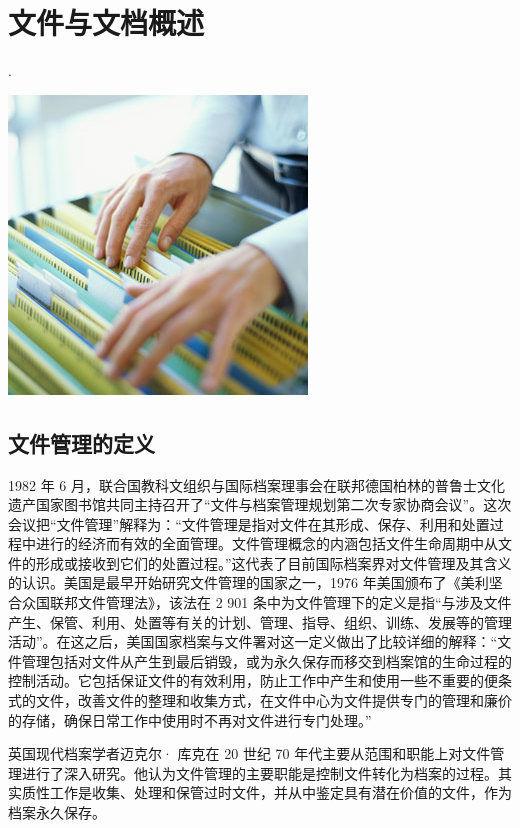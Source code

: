 \section {文件与文档概述}

.
    \begin{center}
        \includegraphics[scale=0.7] {pickfile.jpg}
    \end{center}

    \subsection {文件管理的定义}

    1982 年 6 月，联合国教科文组织与国际档案理事会在联邦德国柏林的普鲁士文化遗产国家图书馆共同主持召开了“文件与档案管理规划第二次专家协商会议”。这次会议把“文件管理”解释为：“文件管理是指对文件在其形成、保存、利用和处置过程中进行的经济而有效的全面管理。文件管理概念的内涵包括文件生命周期中从文件的形成或接收到它们的处置过程。”这代表了目前国际档案界对文件管理及其含义的认识。美国是最早开始研究文件管理的国家之一，1976 年美国颁布了《美利坚合众国联邦文件管理法》，该法在 2 901 条中为文件管理下的定义是指“与涉及文件产生、保管、利用、处置等有关的计划、管理、指导、组织、训练、发展等的管理活动”。在这之后，美国国家档案与文件署对这一定义做出了比较详细的解释：“文件管理包括对文件从产生到最后销毁，或为永久保存而移交到档案馆的生命过程的控制活动。它包括保证文件的有效利用，防止工作中产生和使用一些不重要的便条式的文件，改善文件的整理和收集方式，在文件中心为文件提供专门的管理和廉价的存储，确保日常工作中使用时不再对文件进行专门处理。”

    英国现代档案学者迈克尔· 库克在 20 世纪 70 年代主要从范围和职能上对文件管理进行了深入研究。他认为文件管理的主要职能是控制文件转化为档案的过程。其实质性工作是收集、处理和保管过时文件，并从中鉴定具有潜在价值的文件，作为档案永久保存。

